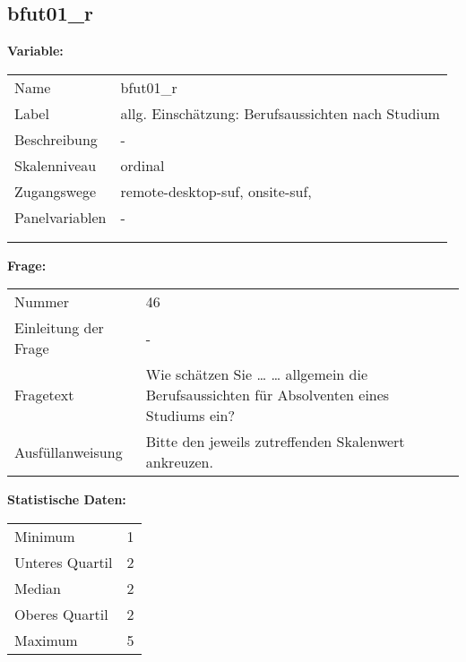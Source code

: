 	
	
	\subsection{bfut01\_r}
	\label{subSection:bfut01_r}

	\noindent\textbf{Variable:}\\
		\begin{tabular}{lL{11.3cm}}
			\label{tableVariable:bfut01_r}
			Name & bfut01\_r \\
			Label & allg. Einschätzung: Berufsaussichten nach Studium \\
			Beschreibung & - \\
			Skalenniveau & ordinal \\
			Zugangswege &
				remote-desktop-suf,
				onsite-suf,
 \\
			Panelvariablen & -
			 \\
			 \\
 \\
		\end{tabular}

		\vspace*{1 cm}
		\noindent\textbf{Frage:}\\
		\begin{tabular}{lL{11.3cm}}
			\label{tableQuestion:bfut01_r}
			Nummer & 46 \\
			Einleitung der Frage & - \\
			Fragetext & Wie schätzen Sie …
… allgemein die Berufsaussichten für Absolventen eines Studiums ein? \\
			Ausfüllanweisung & Bitte den jeweils zutreffenden Skalenwert ankreuzen. \\
		\end{tabular}


		\vspace*{1 cm}
		\noindent\textbf{Statistische Daten:}\\
			\begin{tabular}{ll}
				\label{tableStatistics:bfut01_r}
					Minimum & 1 \\
					Unteres Quartil & 2 \\
					Median & 2 \\
					Oberes Quartil & 2 \\
					Maximum & 5 \\
			\end{tabular}



